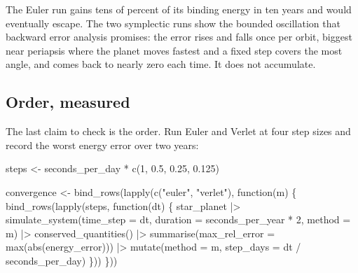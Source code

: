 \documentclass[
  10.5pt,
  letterpaper,
]{scrbook}
\newenvironment{Shaded}{\begin{snugshade}}{\end{snugshade}}
\newcommand{\AttributeTok}[1]{\textcolor[rgb]{0.00,0.00,0.00}{#1}}
\newcommand{\ControlFlowTok}[1]{\textcolor[rgb]{0.00,0.00,0.00}{#1}}
\newcommand{\DecValTok}[1]{\textcolor[rgb]{0.00,0.00,0.00}{#1}}
\newcommand{\FloatTok}[1]{\textcolor[rgb]{0.00,0.00,0.00}{#1}}
\newcommand{\FunctionTok}[1]{\textcolor[rgb]{0.00,0.00,0.00}{#1}}
\newcommand{\NormalTok}[1]{\textcolor[rgb]{0.00,0.00,0.00}{#1}}
\newcommand{\OtherTok}[1]{\textcolor[rgb]{0.00,0.00,0.00}{#1}}
\newcommand{\SpecialCharTok}[1]{\textcolor[rgb]{0.00,0.00,0.00}{#1}}
\newcommand{\StringTok}[1]{\textcolor[rgb]{0.00,0.00,0.00}{#1}}
\theoremstyle{plain}
\theoremstyle{remark}
\begin{document}
The Euler run gains tens of percent of its binding energy in ten years
and would eventually escape. The two symplectic runs show the bounded
oscillation that backward error analysis promises: the error rises and
falls once per orbit, biggest near periapsis where the planet moves
fastest and a fixed step covers the most angle, and comes back to nearly
zero each time. It does not accumulate.

\subsection{Order, measured}\label{order-measured}

The last claim to check is the order. Run Euler and Verlet at four step
sizes and record the worst energy error over two years:

\begin{Shaded}
\begin{Highlighting}[]
\NormalTok{steps }\OtherTok{\textless{}{-}}\NormalTok{ seconds\_per\_day }\SpecialCharTok{*} \FunctionTok{c}\NormalTok{(}\DecValTok{1}\NormalTok{, }\FloatTok{0.5}\NormalTok{, }\FloatTok{0.25}\NormalTok{, }\FloatTok{0.125}\NormalTok{)}

\NormalTok{convergence }\OtherTok{\textless{}{-}} \FunctionTok{bind\_rows}\NormalTok{(}\FunctionTok{lapply}\NormalTok{(}\FunctionTok{c}\NormalTok{(}\StringTok{"euler"}\NormalTok{, }\StringTok{"verlet"}\NormalTok{), }\ControlFlowTok{function}\NormalTok{(m) \{}
  \FunctionTok{bind\_rows}\NormalTok{(}\FunctionTok{lapply}\NormalTok{(steps, }\ControlFlowTok{function}\NormalTok{(dt) \{}
\NormalTok{    star\_planet }\SpecialCharTok{|\textgreater{}}
      \FunctionTok{simulate\_system}\NormalTok{(}\AttributeTok{time\_step =}\NormalTok{ dt, }\AttributeTok{duration =}\NormalTok{ seconds\_per\_year }\SpecialCharTok{*} \DecValTok{2}\NormalTok{,}
                      \AttributeTok{method =}\NormalTok{ m) }\SpecialCharTok{|\textgreater{}}
      \FunctionTok{conserved\_quantities}\NormalTok{() }\SpecialCharTok{|\textgreater{}}
      \FunctionTok{summarise}\NormalTok{(}\AttributeTok{max\_rel\_error =} \FunctionTok{max}\NormalTok{(}\FunctionTok{abs}\NormalTok{(energy\_error))) }\SpecialCharTok{|\textgreater{}}
      \FunctionTok{mutate}\NormalTok{(}\AttributeTok{method =}\NormalTok{ m, }\AttributeTok{step\_days =}\NormalTok{ dt }\SpecialCharTok{/}\NormalTok{ seconds\_per\_day)}
\NormalTok{  \}))}
\NormalTok{\}))}


\end{Highlighting}
\end{Shaded}
\end{document}
